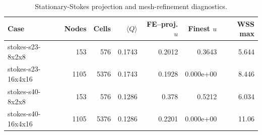 \begin{table}[!htb]
    \centering
    \scriptsize
    \caption{Stationary-Stokes projection and mesh-refinement diagnostics.}
    \begin{tabular}{@{}lrrrrrr@{}}
        \toprule
        Case & Nodes & Cells & $\langle Q\rangle$ & FE--proj. $u$ & Finest $u$ & WSS max \\
        \midrule
stokes-s23-8x2x8 & 153 & 576 & 0.1743 & 0.2012 & 0.3643 & 5.644 \\
stokes-s23-16x4x16 & 1105 & 5376 & 0.1743 & 0.1928 & 0.000e+00 & 8.446 \\
stokes-s40-8x2x8 & 153 & 576 & 0.1286 & 0.378 & 0.5212 & 6.034 \\
stokes-s40-16x4x16 & 1105 & 5376 & 0.1286 & 0.2201 & 0.000e+00 & 11.06 \\
        \bottomrule
    \end{tabular}
\end{table}
